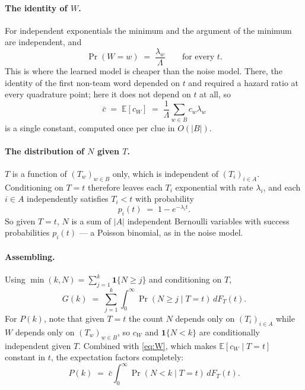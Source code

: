 \documentclass[12pt]{article}
\begin{document}
\paragraph{The identity of $W$.} For independent exponentials the minimum and
the argument of the minimum are independent, and
\begin{equation}
  \label{eq:W}
  \Pr(W = w) \;=\; \frac{\lambda_w}{\Lambda}
  \qquad\text{for every } t .
\end{equation}
This is where the learned model is cheaper than the noise model. There, the
identity of the first non-team word depended on $t$ and required a hazard
ratio at every quadrature point; here it does not depend on $t$ at all, so
\[ \bar c \;=\; \mathbb E[c_W] \;=\; \frac{1}{\Lambda}\sum_{w \in B} c_w \lambda_w \]
is a single constant, computed once per clue in $O(|B|)$.

\paragraph{The distribution of $N$ given $T$.} $T$ is a function of
$(T_w)_{w \in B}$ only, which is independent of $(T_i)_{i \in A}$. Conditioning
on $T = t$ therefore leaves each $T_i$ exponential with rate $\lambda_i$, and
each $i \in A$ independently satisfies $T_i < t$ with probability
\begin{equation}
  \label{eq:p}
  p_i(t) \;=\; 1 - e^{-\lambda_i t}.
\end{equation}
So given $T = t$, $N$ is a sum of $|A|$ independent Bernoulli variables with
success probabilities $p_i(t)$ --- a Poisson binomial, as in the noise model.

\paragraph{Assembling.} Using $\min(k,N) = \sum_{j=1}^{k}\mathbf 1\{N \ge j\}$
and conditioning on $T$,
\begin{equation}
  \label{eq:G}
  G(k) \;=\; \sum_{j=1}^{k} \int_0^\infty \Pr(N \ge j \mid T = t)\, dF_T(t).
\end{equation}
For $P(k)$, note that given $T = t$ the count $N$ depends only on
$(T_i)_{i \in A}$ while $W$ depends only on $(T_w)_{w \in B}$, so $c_W$ and
$\mathbf 1\{N < k\}$ are conditionally independent given $T$. Combined with
\eqref{eq:W}, which makes $\mathbb E[c_W \mid T = t]$ constant in $t$, the
expectation factors completely:
\begin{equation}
  \label{eq:P}
  P(k) \;=\; \bar c \int_0^\infty \Pr(N < k \mid T = t)\, dF_T(t).
\end{equation}
\end{document}

